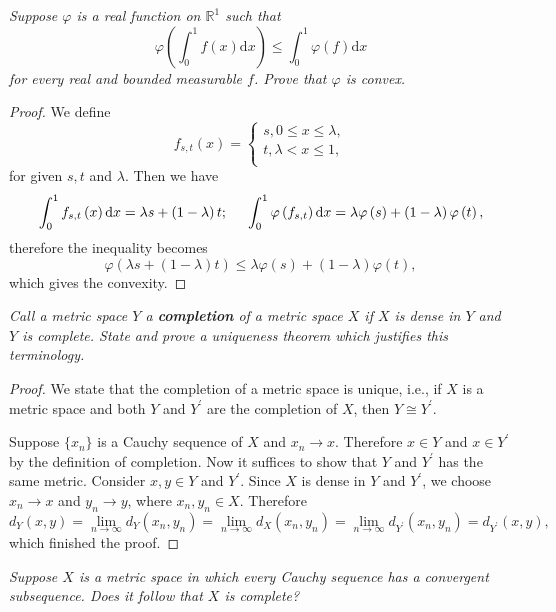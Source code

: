 \begin{problem}\em
Suppose $\varphi$ is a real function on $\mathbb{R}^1$ such that 
$$
\varphi \left( \int_0^1{f\left( x \right) \mathrm{d}x} \right) \le \int_0^1{\varphi \left( f \right) \mathrm{d}x}
$$
for every real and bounded measurable $f$. Prove that $\varphi$ is convex.
\end{problem}
\begin{proof}
We define 
$$
f_{s,t}\left( x \right) =\begin{cases}
	s,0\le x\le \lambda ,\\
	t,\lambda <x\le 1,\\
\end{cases}
$$
for given $s,t$ and $\lambda$. Then we have 
$$
\int_0^1{f_{s,t}\left( x \right) \mathrm{d}x}=\lambda s+\left( 1-\lambda \right) t;\hspace{0.5cm}\int_0^1{\varphi \left( f_{s,t} \right) \mathrm{d}x}=\lambda \varphi \left( s \right) +\left( 1-\lambda \right) \varphi \left( t \right) ,
$$
therefore the inequality becomes 
$$
\varphi \left( \lambda s+\left( 1-\lambda \right) t \right) \le \lambda \varphi \left( s \right) +\left( 1-\lambda \right) \varphi \left( t \right) ,
$$
which gives the convexity.
\end{proof}
\begin{problem}\em
Call a metric space $Y$ a \textbf{completion} of a metric space $X$ if $X$ is dense in $Y$ and $Y$ is complete. State and prove a uniqueness theorem which justifies this terminology.
\end{problem}
\begin{proof}
We state that the completion of a metric space is unique, i.e., if $X$ is a metric space and both $Y$ and $Y^\prime$ are the completion of $X$, then $Y\cong Y^\prime$.\par
Suppose $\{x_n\}$ is a Cauchy sequence of $X$ and $x_n\to x$. Therefore $x\in Y$ and $x\in Y^\prime$ by the definition of completion. Now it suffices to show that $Y$ and $Y^\prime$ has the same metric. Consider $x,y\in Y$ and $Y^\prime$. Since $X$ is dense in $Y$ and $Y^\prime$, we choose $x_n\to x$ and $y_n\to y$, where $x_n,y_n\in X$. Therefore 
$$
d_Y\left( x,y \right) =\lim_{n\rightarrow \infty} d_Y\left( x_n,y_n \right) =\lim_{n\rightarrow \infty} d_X\left( x_n,y_n \right) =\lim_{n\rightarrow \infty} d_{Y^{\prime}}\left( x_n,y_n \right) =d_{Y^{\prime}}\left( x,y \right) ,
$$
which finished the proof.
\end{proof}
\begin{problem}\em
Suppose $X$ is a metric space in which every Cauchy sequence has a convergent subsequence. Does it follow that $X$ is complete?
\end{problem}
